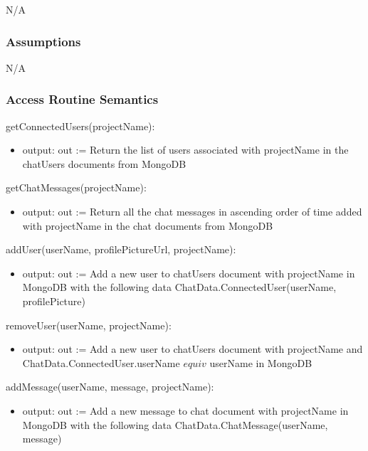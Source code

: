 \documentclass[12pt, titlepage]{article}
\begin{document}
	N/A
	
	\subsubsection{Assumptions}
	
	N/A
	
	\subsubsection{Access Routine Semantics}
	
	\noindent getConnectedUsers(projectName):
	\begin{itemize}
		
		\item output: out := Return the list of users associated with projectName in the chatUsers documents from MongoDB
		
	\end{itemize}
	
	\noindent getChatMessages(projectName):
	\begin{itemize}
		
		\item output: out := Return all the chat messages in ascending order of time added with projectName in the chat documents from MongoDB
		
	\end{itemize}
	
	\noindent addUser(userName, profilePictureUrl, projectName):
	\begin{itemize}
		
		\item output: out := Add a new user to chatUsers document with projectName in MongoDB with the following data ChatData.ConnectedUser(userName, profilePicture)
		
	\end{itemize}
	
	\noindent removeUser(userName, projectName):
	\begin{itemize}
		
		\item output: out := Add a new user to chatUsers document with projectName and ChatData.ConnectedUser.userName $equiv$ userName in MongoDB
		
	\end{itemize}
	
	\noindent addMessage(userName, message, projectName):
	\begin{itemize}
		
		\item output: out := Add a new message to chat document with projectName in MongoDB with the following data ChatData.ChatMessage(userName, message)
		
	\end{itemize}
	
\end{document}
